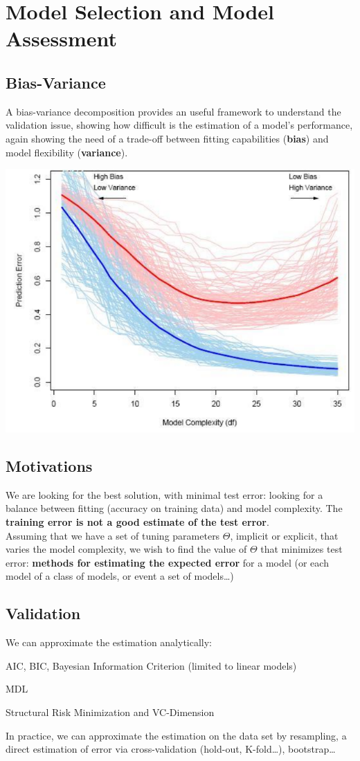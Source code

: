 \documentclass[10pt]{report}
\begin{document}
\section{Model Selection and Model Assessment}
\subsection{Bias-Variance} A bias-variance decomposition provides an useful framework to understand the validation issue, showing how difficult is the estimation of a model's performance, again showing the need of a trade-off between fitting capabilities (\textbf{bias}) and model flexibility (\textbf{variance}).
\begin{center}
	\includegraphics[scale=0.75]{10.png}
\end{center}
\subsection{Motivations} We are looking for the best solution, with minimal test error: looking for a balance between fitting (accuracy on training data) and model complexity. The \textbf{training error is not a good estimate of the test error}.\\
Assuming that we have a set of tuning parameters $\Theta$, implicit or explicit, that varies the model complexity, we wish to find the value of $\Theta$ that minimizes test error: \textbf{methods for estimating the expected error} for a model (or each model of a class of models, or event a set of models\ldots)
\subsection{Validation}
We can approximate the estimation analytically:
\begin{list}{}{}
	\item AIC, BIC, Bayesian Information Criterion (limited to linear models)
	\item MDL
	\item Structural Risk Minimization and VC-Dimension
\end{list}
In practice, we can approximate the estimation on the data set by resampling, a direct estimation of error via cross-validation (hold-out, K-fold\ldots), bootstrap\ldots
\end{document}
